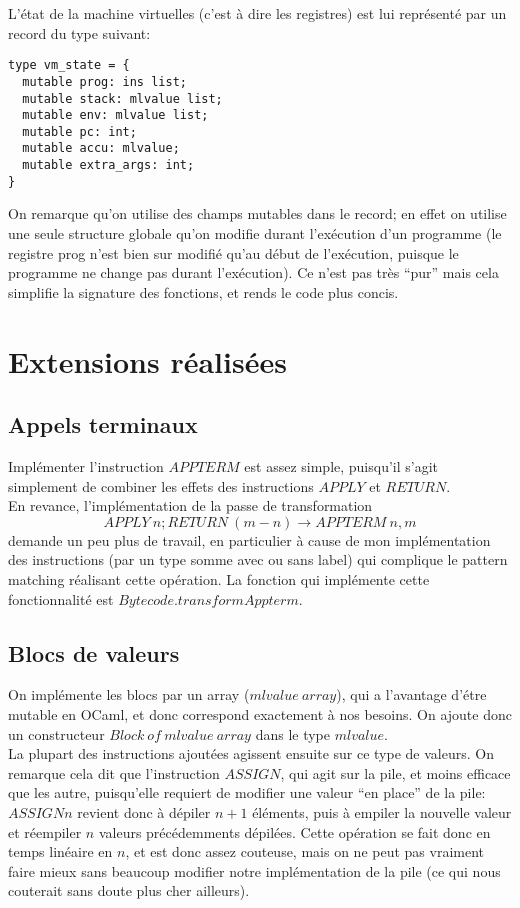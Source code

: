\documentclass{article}
\begin{document}
L'état de la machine virtuelles (c'est à dire les registres) est lui représenté par un record du type suivant:
\begin{lstlisting}
type vm_state = {
  mutable prog: ins list;
  mutable stack: mlvalue list;
  mutable env: mlvalue list;
  mutable pc: int;
  mutable accu: mlvalue;
  mutable extra_args: int;
}
\end{lstlisting}
On remarque qu'on utilise des champs mutables dans le record; en effet on utilise une seule structure globale qu'on modifie durant l'exécution d'un programme (le registre prog n'est bien sur modifié qu'au début de l'exécution, puisque le programme ne change pas durant l'exécution). Ce n'est pas très ``pur'' mais cela simplifie la signature des fonctions, et rends le code plus concis.

\section{Extensions réalisées}

\subsection{Appels terminaux}
Implémenter l'instruction $APPTERM$ est assez simple, puisqu'il s'agit simplement de combiner les effets des instructions $APPLY$ et $RETURN$.\\
En revance, l'implémentation de la passe de transformation $$APPLY\:n;RETURN\:(m-n) \rightarrow APPTERM\:n,m$$ demande un peu plus de travail, en particulier à cause de mon implémentation des instructions (par un type somme avec ou sans label) qui complique le pattern matching réalisant cette opération. La fonction qui implémente cette fonctionnalité est $Bytecode.transformAppterm$.

\subsection{Blocs de valeurs}
On implémente les blocs par un array ($mlvalue\:array$), qui a l'avantage d'étre mutable en OCaml, et donc correspond exactement à nos besoins. On ajoute donc un constructeur $Block\:of\:mlvalue\:array$ dans le type $mlvalue$.\\
La plupart des instructions ajoutées agissent ensuite sur ce type de valeurs. On remarque cela dit que l'instruction $ASSIGN$, qui agit sur la pile, et moins efficace que les autre, puisqu'elle requiert de modifier une valeur ``en place'' de la pile: $ASSIGN n$ revient donc à dépiler $n+1$ éléments, puis à empiler la nouvelle valeur et réempiler $n$ valeurs précédemments dépilées. Cette opération se fait donc en temps linéaire en $n$, et est donc assez couteuse, mais on ne peut pas vraiment faire mieux sans beaucoup modifier notre implémentation de la pile (ce qui nous couterait sans doute plus cher ailleurs).
\end{document}

